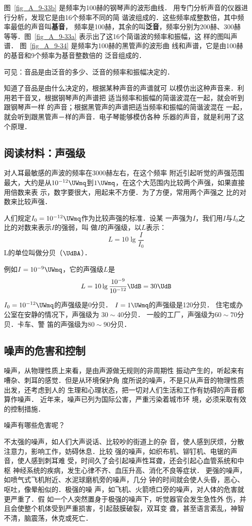 图~\ref{fig_A_9-33b} 是频率为100赫的钢琴声的波形曲线．
用专门分析声音的仪器进行分析，发现它是由16个频率不同的简
谐波组成的．这些频率成整数倍，其中频率最低的声音叫\textbf{基音}，
频率是100赫，其余的叫\textbf{泛音}，频率分别为200赫、300赫
等等．图~\ref{fig_A_9-33a} 表示出了这16个简谐波的频率和振幅，这
样的图叫声谱．
图~\ref{fig_A_9-34} 是频率为100赫的黑管声的波形曲
线和声谱，它是由100赫的基音和9个频率为基音整数倍的
泛音组成的．

可见：音品是由泛音的多少、泛音的频率和振幅决定的．

知道了音品是由什么决定的，根据某种声音的声谱就可
以模仿出这种声音来．利用若干音叉，根据钢琴声的声谱把
适当频率和振幅的简谐波混在一起，就会听到跟钢琴声一样
的声音；根据黑管声的声谱把适当频率和振幅的简谐波混在
一起，就会听到跟黑管声－样的声音．电子琴能够模仿各种
乐器的声音，就是利用了这个原理．


\subsection*{阅读材料：声强级}
对人耳最敏感的声波的频率在3000赫左右，在这个频率
附近引起听觉的声强范围最大，大约是从$10^{-12} \UWmq $到$1 \UWmq $，在这个大范围内比较两个声强，如果直接用倍数来表
示，数字要很大，用起来不方便．为了方便，常用两个声强之
比的对数来比较声强．

人们规定$I_0=10^{-12} \UWmq $作为比较声强的标准．设某
一声强为$I$，我们用$I$与$I_0$之比的对数来表示$I$的强弱，叫
做$I$的声强级，以$L$表示：
\[L=10\lg \frac{I}{I_0} \]
L的单位叫做分贝（$\UdBA$）．

例如$I=10^{-9} \UWmq $，它的声强级$L$是
\[L=10\lg \frac{10^{-9}}{10^{-12}} \UdB=30 \UdB \]

$I_0=10^{-12} \UWmq $的声强级是0分贝．
$I=1 \UWmq $的声强级是120分贝．
住宅或办公室在安静的情况下，声强级为
$30\sim 40$分贝．
一般的工厂，声强级为$60\sim 70$分贝．卡车、警
笛的声强级为$80\sim 90$分贝．

\subsection{噪声的危害和控制}
噪声，从物理性质上来看，是由声源做无规则的非周期性
振动产生的，听起来有嘈杂、刺耳的感觉．但是从环境保护角
度所说的噪声，不是只从声音的物理性质出发，还考虑到人的
生理和心理状态，把一切对人们生活和工作有妨碍的声音都
算作噪声．
近年来，噪声已列为国际公害，严重污染着城市环
境，必须采取有效的控制措施．

噪声有哪些危害呢？

不太强的噪声，如人们大声说话、比较吵的街道上的杂
音，使人感到厌烦，分散注意力，影响工作，妨碍休息．比较
强的噪声，如织布机、铆钉机、电锯的声音，使人感到刺耳难
受，时间久了会引起噪声性耳聋，还会引起心血管系统和中枢
神经系统的疾病，发生心律不齐、血压升高、消化不良等症状．
更强的噪声，如喷气式飞机附近、水泥球磨机旁的噪声，几分
钟的时间就会使人头昏，恶心、呕吐，像晕船似的．极强的噪
声，如飞机、火箭喷口旁的噪声，对人体的危害就更严重了．假
如一个人突然置身于极强的噪声下，听觉器官会发生急性外
伤，并且会使整个机体受到严重损害，引起鼓膜破裂，双耳变
聋，甚至语言紊乱，神智不清，脑震荡，休克或死亡．

